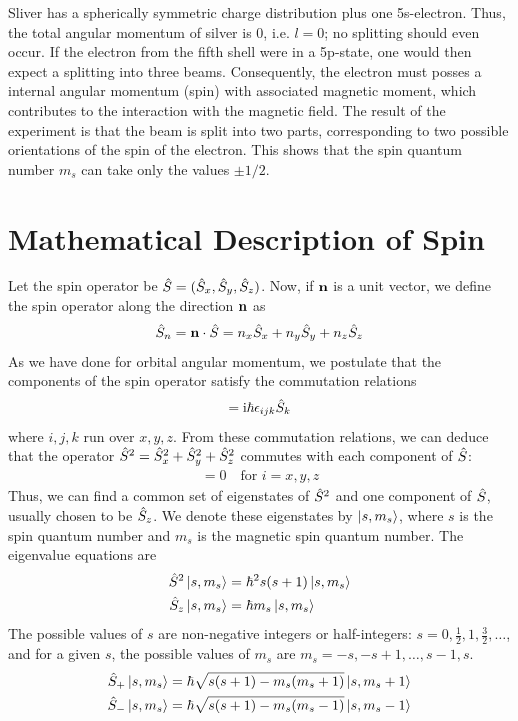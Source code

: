 Sliver has a spherically symmetric charge distribution plus one 5s-electron. Thus, the total angular momentum of silver is 0, i.e. $l=0$; no splitting should even occur. If the electron from the fifth shell were in a 5p-state, one would then expect a splitting into three beams.
Consequently, the electron must posses a internal angular momentum (spin) with associated magnetic moment, which contributes to the interaction with the magnetic field. The result of the experiment is that the beam is split into two parts, corresponding to two possible orientations of the spin of the electron. This shows that the spin quantum number $m_s$ can take only the values $\pm 1/2$.

\section{Mathematical Description of Spin}
Let the spin operator be $\hat{S} = (\hat{S}_x, \hat{S}_y, \hat{S}_z)$. Now, if $\mathbf{n}$ is a unit vector, we define the spin operator along the direction $\mathbf{n}$ as
\begin{align}
    \hat{S}_n = \mathbf{n} \cdot \hat{S} = n_x \hat{S}_x + n_y \hat{S}_y + n_z \hat{S}_z
\end{align}
As we have done for orbital angular momentum, we postulate that the components of the spin operator satisfy the commutation relations
\begin{align}
    [\oS_i, \oS_j] = \ii \hbar \epsilon_{ijk} \oS_k
\end{align}
where $i,j,k$ run over $x,y,z$. From these commutation relations, we can deduce that the operator $\hat{S}^2 = \hat{S}_x^2 + \hat{S}_y^2 + \hat{S}_z^2$ commutes with each component of $\hat{S}$:
\begin{align}
    [\oS^2, \oS_i] = 0 \quad \text{for } i=x,y,z
\end{align}
Thus, we can find a common set of eigenstates of $\hat{S}^2$ and one component of $\hat{S}$, usually chosen to be $\hat{S}_z$. We denote these eigenstates by $\ket{s,m_s}$, where $s$ is the spin quantum number and $m_s$ is the magnetic spin quantum number. The eigenvalue equations are
\begin{align}
    \hat{S}^2 \ket{s,m_s} & = \hbar^2 s(s+1) \ket{s,m_s} \\
    \hat{S}_z \ket{s,m_s} & = \hbar m_s \ket{s,m_s}
\end{align}
The possible values of $s$ are non-negative integers or half-integers: $s = 0, \frac{1}{2}, 1, \frac{3}{2}, \dots$, and for a given $s$, the possible values of $m_s$ are $m_s = -s, -s+1, \dots, s-1, s$.
\begin{align}
    \hat{S}_+ \ket{s,m_s} & = \hbar \sqrt{s(s+1) - m_s(m_s+1)} \ket{s,m_s+1} \\
    \hat{S}_- \ket{s,m_s} & = \hbar \sqrt{s(s+1) - m_s(m_s-1)} \ket{s,m_s-1}
\end{align}

